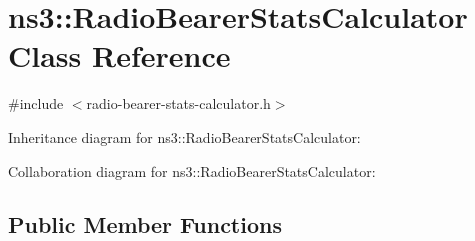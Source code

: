 \hypertarget{classns3_1_1RadioBearerStatsCalculator}{}\section{ns3\+:\+:Radio\+Bearer\+Stats\+Calculator Class Reference}
\label{classns3_1_1RadioBearerStatsCalculator}


{\ttfamily \#include $<$radio-\/bearer-\/stats-\/calculator.\+h$>$}



Inheritance diagram for ns3\+:\+:Radio\+Bearer\+Stats\+Calculator\+:


Collaboration diagram for ns3\+:\+:Radio\+Bearer\+Stats\+Calculator\+:
\subsection*{Public Member Functions}
